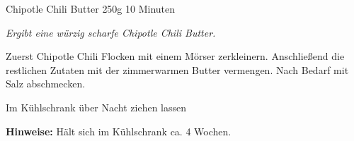 \begin{recipe}{Chipotle Chili Butter} {250g} {10 Minuten}

\freeform
\textit{Ergibt eine würzig scharfe Chipotle Chili Butter.}


Zuerst Chipotle Chili Flocken mit einem Mörser zerkleinern.
Anschließend die restlichen Zutaten mit der zimmerwarmen Butter vermengen.
Nach Bedarf mit Salz abschmecken.

\newstep
Im Kühlschrank über Nacht ziehen lassen

\freeform
\hrulefill

\freeform
\textbf{Hinweise:}
Hält sich im Kühlschrank ca. 4 Wochen.

\end{recipe}
